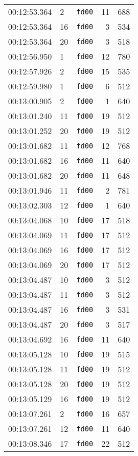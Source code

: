 \documentclass{article}
\begin{document}
\begin{longtable}{lllrr}
00:12:53.364 & 2 & \texttt{fd00} & 11 & 688 \\
00:12:53.364 & 16 & \texttt{fd00} & 3 & 534 \\
00:12:53.364 & 20 & \texttt{fd00} & 3 & 518 \\
00:12:56.950 & 1 & \texttt{fd00} & 12 & 780 \\
00:12:57.926 & 2 & \texttt{fd00} & 15 & 535 \\
00:12:59.980 & 1 & \texttt{fd00} & 6 & 512 \\
00:13:00.905 & 2 & \texttt{fd00} & 1 & 640 \\
00:13:01.240 & 11 & \texttt{fd00} & 19 & 512 \\
00:13:01.252 & 20 & \texttt{fd00} & 19 & 512 \\
00:13:01.682 & 11 & \texttt{fd00} & 12 & 768 \\
00:13:01.682 & 16 & \texttt{fd00} & 11 & 640 \\
00:13:01.682 & 20 & \texttt{fd00} & 11 & 648 \\
00:13:01.946 & 11 & \texttt{fd00} & 2 & 781 \\
00:13:02.303 & 12 & \texttt{fd00} & 1 & 640 \\
00:13:04.068 & 10 & \texttt{fd00} & 17 & 518 \\
00:13:04.069 & 11 & \texttt{fd00} & 17 & 512 \\
00:13:04.069 & 16 & \texttt{fd00} & 17 & 512 \\
00:13:04.069 & 20 & \texttt{fd00} & 17 & 512 \\
00:13:04.487 & 10 & \texttt{fd00} & 3 & 512 \\
00:13:04.487 & 11 & \texttt{fd00} & 3 & 512 \\
00:13:04.487 & 16 & \texttt{fd00} & 3 & 531 \\
00:13:04.487 & 20 & \texttt{fd00} & 3 & 517 \\
00:13:04.692 & 16 & \texttt{fd00} & 11 & 640 \\
00:13:05.128 & 10 & \texttt{fd00} & 19 & 515 \\
00:13:05.128 & 11 & \texttt{fd00} & 19 & 512 \\
00:13:05.128 & 20 & \texttt{fd00} & 19 & 512 \\
00:13:05.129 & 16 & \texttt{fd00} & 19 & 512 \\
00:13:07.261 & 2 & \texttt{fd00} & 16 & 657 \\
00:13:07.261 & 12 & \texttt{fd00} & 11 & 640 \\
00:13:08.346 & 17 & \texttt{fd00} & 22 & 512 \\

\end{longtable}
\end{document}
